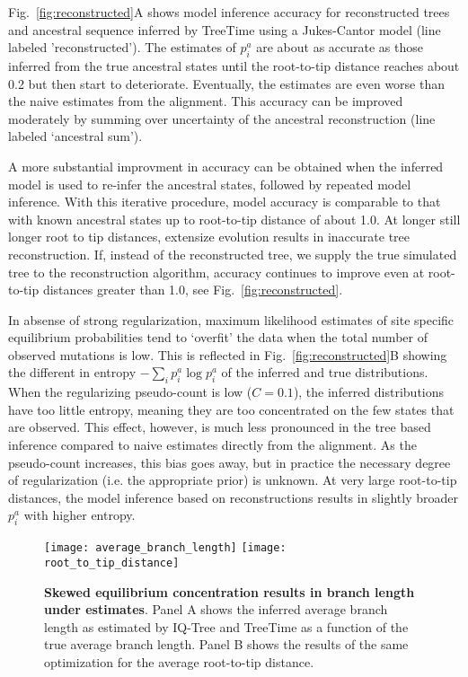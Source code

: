 \documentclass[aps,rmp, onecolumn]{revtex4}
\newcommand{\eqp}{p}
\begin{document}
Fig.~\ref{fig:reconstructed}A shows model inference accuracy for reconstructed trees and ancestral sequence inferred by TreeTime using a Jukes-Cantor model (line labeled 'reconstructed').
The estimates of $\eqp_i^a$ are about as accurate as those inferred from the true ancestral states until the root-to-tip distance reaches about 0.2 but then start to deteriorate.
Eventually, the estimates are even worse than the naive estimates from the alignment.
This accuracy can be improved moderately by summing over uncertainty of the ancestral reconstruction (line labeled `ancestral sum').

A more substantial improvment in accuracy can be obtained when the inferred model is used to re-infer the ancestral states, followed by repeated model inference.
With this iterative procedure, model accuracy is comparable to that with known ancestral states up to root-to-tip distance of about 1.0.
At longer still longer root to tip distances, extensize evolution results in inaccurate tree reconstruction.
If, instead of the reconstructed tree, we supply the true simulated tree to the reconstruction algorithm, accuracy continues to improve even at root-to-tip distances greater than 1.0, see Fig.~\ref{fig:reconstructed}.

In absense of strong regularization, maximum likelihood estimates of site specific equilibrium probabilities tend to `overfit' the data when the total number of observed mutations is low.
This is reflected in Fig.~\ref{fig:reconstructed}B showing the different in entropy $-\sum_i \eqp_i^a \log \eqp_i^a$ of the inferred and true distributions.
When the regularizing pseudo-count is low ($C=0.1$), the inferred distributions have too little entropy, meaning they are too concentrated on the few states that are observed.
This effect, however, is much less pronounced in the tree based inference compared to naive estimates directly from the alignment.
As the pseudo-count increases, this bias goes away, but in practice the necessary degree of regularization (i.e. the appropriate prior) is unknown.
At very large root-to-tip distances, the model inference based on reconstructions results in slightly broader $\eqp_i^a$ with higher entropy.

\begin{figure}[tb]
	\centering
	\texttt{[image: average\_branch\_length]}
	\texttt{[image: root\_to\_tip\_distance]}
	\caption{{\bf Skewed equilibrium concentration results in branch length under estimates}.
	Panel A shows the inferred average branch length as estimated by IQ-Tree and TreeTime as a function of the true average branch length. Panel B shows the results of the same optimization for the average root-to-tip distance.}
	\label{fig:tree_length}
\end{figure}
\end{document}
